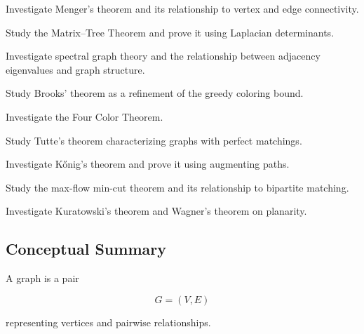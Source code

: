 \begin{exercise}[4]
Investigate Menger's theorem and its relationship to vertex and edge
connectivity.
\end{exercise}

\begin{exercise}[4]
Study the Matrix--Tree Theorem and prove it using Laplacian
determinants.
\end{exercise}

\begin{exercise}[4]
Investigate spectral graph theory and the relationship between adjacency
eigenvalues and graph structure.
\end{exercise}

\begin{exercise}[4]
Study Brooks' theorem as a refinement of the greedy coloring bound.
\end{exercise}

\begin{exercise}[4]
Investigate the Four Color Theorem.
\end{exercise}

\begin{exercise}[4]
Study Tutte's theorem characterizing graphs with perfect matchings.
\end{exercise}

\begin{exercise}[4]
Investigate K\H{o}nig's theorem and prove it using augmenting paths.
\end{exercise}

\begin{exercise}[4]
Study the max-flow min-cut theorem and its relationship to bipartite
matching.
\end{exercise}

\begin{exercise}[4]
Investigate Kuratowski's theorem and Wagner's theorem on planarity.
\end{exercise}

\subsection{Conceptual Summary}
\label{subsec:graph-theory-summary}

A graph is a pair

\[
\boxed{
G=(V,E)
}
\]

representing vertices and pairwise relationships.

